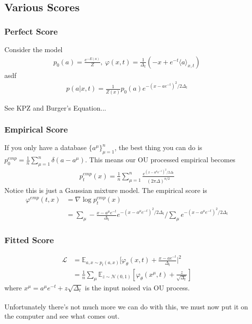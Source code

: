 \subsection{Various Scores}
\subsubsection{Perfect Score}
Consider the model
\begin{align}
	p_0(a) = \frac{e^{-E(a)}}{Z}, ~ \varphi(x,t) = \frac{1}{\Delta_t} (-x + e^{-t}\langle a \rangle_{x,t})
\end{align}
asdf
\begin{align}
	p(a|x,t) = \frac{1}{Z(x)} p_0(a) e^{-(x - a e^{-t} )^2/ 2 \Delta_t}
\end{align}

\begin{sidework}
	See KPZ and Burger's Equation...
\end{sidework}

\subsubsection{Empirical Score}
If you only have a database $\{a^\mu\}_{\mu=1}^n$, the best thing you can do is $p_0^{emp} = \frac{1}{n} \sum_{\mu=1}^n \delta(a - a^\mu)$. This means our OU processed empirical becomes
\begin{align}
	p_t^{emp}(x) = \frac{1}{n} \sum_{\mu=1}^n \frac{e^{(x-a^\mu e^{-t})^2 / 2\Delta_t}}{(2\pi \Delta)^{n/2}}
\end{align}
Notice this is just a Gaussian mixture model. The empirical score is
\begin{align}
	\varphi^{emp}(t,x) & = \nabla \log p_t^{emp}(x) \\
	& = \sum_\mu - \frac{x - a^\mu e^{-t}}{\Delta_t} e^{-(x - a^\mu e^{-t})^2/2\Delta_t} \Big / \sum_\mu e^{- (x - a^\mu e^{-t})^2 / 2\Delta_t} 
\end{align}

\subsubsection{Fitted Score}
\begin{align}
	\mathcal L & = \mathbb E_{a,x \sim p_t(a,x)} [ \varphi_\theta(x,t) + \frac{x - a e^{-t}}{\Delta_t}|^2\\
	& = \frac{1}{n} \sum_\mu \mathbb E_{z \sim \mathcal N(0,1)} \left [ \varphi_\theta(x^\mu, t) + \frac{z}{\sqrt{\Delta_t}} \right]
\end{align} 
where $x^\mu = a^\mu e^{-t} + z \sqrt{\Delta_t}$ is the input noised via OU process.\\
\\
Unfortunately there's not much more we can do with this, we must now put it on the computer and see what comes out.


